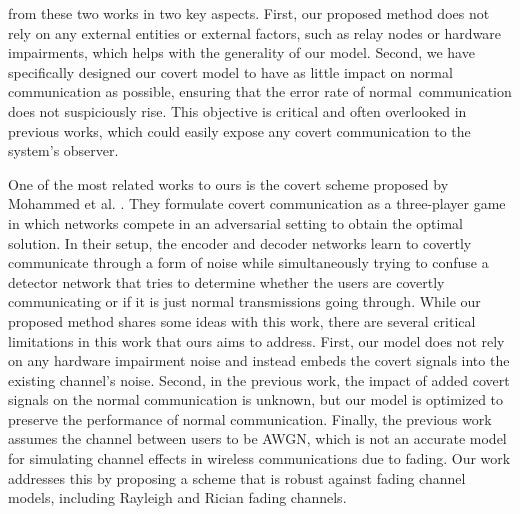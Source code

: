 from these two works in two key aspects. First, our proposed method does not rely on any external entities or external factors, such as relay nodes or hardware impairments, which helps with the generality of our model. Second, we have specifically designed our covert model to have as little impact on normal communication as possible, ensuring that the error rate of normal communication does not suspiciously rise. This objective is critical and often overlooked in previous works, which could easily expose any covert communication to the system's observer.

One of the most related works to ours is the covert scheme proposed by Mohammed et al. \cite{mohammed2021adversarial}. They formulate covert communication as a three-player game in which networks compete in an adversarial setting to obtain the optimal solution. In their setup, the encoder and decoder networks learn to covertly communicate through a form of noise while simultaneously trying to confuse a detector network that tries to determine whether the users are covertly communicating or if it is just normal transmissions going through. While our proposed method shares some ideas with this work, there are several critical limitations in this work that ours aims to address. First, our model does not rely on any hardware impairment noise and instead embeds the covert signals into the existing channel's noise. Second, in the previous work, the impact of added covert signals on the normal communication is unknown, but our model is optimized to preserve the performance of normal communication. Finally, the previous work assumes the channel between users to be AWGN, which is not an accurate model for simulating channel effects in wireless communications due to fading. Our work addresses this by proposing a scheme that is robust against fading channel models, including Rayleigh and Rician fading channels.